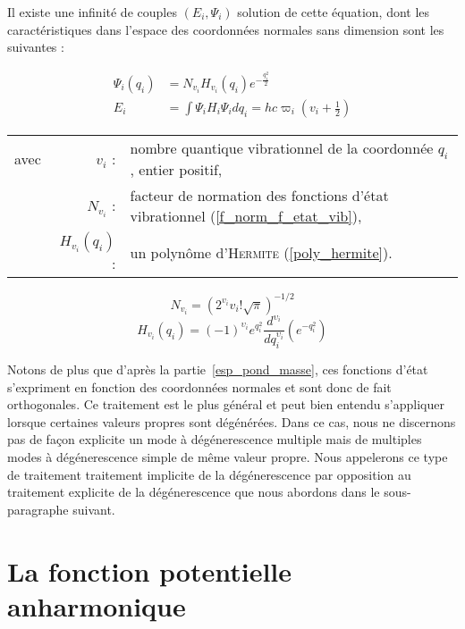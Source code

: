  Il existe une infinité de couples $(E_i, \Psi_i)$ solution de cette équation, dont les caractéristiques dans l'espace des coordonnées normales sans dimension sont les suivantes :
 
\begin{align}
	\Psi_i\left(q_i\right) &= N_{v_i} H_{v_i} \left(q_i\right) e^{-\frac{q^2_i}{2}} \\
	E_i &= \int \Psi_i H_i \Psi_i dq_i = hc \varpi_i\left(v_i + \frac{1}{2}\right)
\end{align}
\begin{tabular}{@{}lrp{14cm}}
avec & $v_i$ : & nombre quantique vibrationnel de la coordonnée $q_i$, entier positif,\\
 & $N_{v_i}$ : & facteur de normation des fonctions d'état vibrationnel (\ref{f_norm_f_etat_vib}),\\
 & $H_{v_i}(q_i)$ : & un polynôme d'\textsc{Hermite} (\ref{poly_hermite}).\\
\end{tabular}


\begin{equation}
N_{v_i} = \left(2^{v_i} v_i ! \sqrt{\pi} \right)^{-1/2}
\label{f_norm_f_etat_vib}
\end{equation}
\begin{equation}
H_{v_i}(q_i) = (-1)^{\upsilon_i} e^{q_{i}^{2}} \frac{d^{\upsilon_i}}{dq_{i}^{\upsilon_i}} \left(e^{-q_{i}^{2}} \right)
\label{poly_hermite}
\end{equation}

Notons de plus que d'après la partie~\ref{esp_pond_masse}, ces fonctions d'état s'expriment en fonction des coordonnées normales et sont donc de fait orthogonales.
Ce traitement est le plus général et peut bien entendu s'appliquer lorsque certaines valeurs propres sont dégénérées. Dans ce cas, nous ne discernons pas de façon explicite un mode à dégénerescence multiple mais de multiples modes à dégénerescence simple de même valeur propre. Nous appelerons ce type de traitement \og traitement implicite de la dégénerescence\fg{} par opposition au \og traitement explicite de la dégénerescence \fg{} que nous abordons dans le sous-paragraphe suivant.




\section{La fonction potentielle anharmonique}

